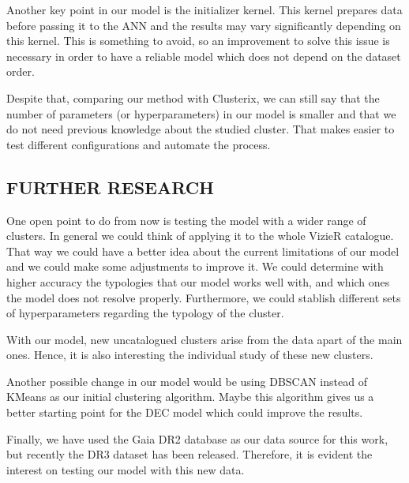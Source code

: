 \documentclass[11pt,a4paper,english,twocolumn]{article}
\begin{document}
Another key point in our model is the initializer kernel.
This kernel prepares data before passing it to the ANN
and the results may vary significantly depending on this kernel.
This is something to avoid, so an improvement to solve this issue is necessary
in order to have a reliable model which does not depend on the dataset order.

Despite that, comparing our method with Clusterix, we can still say that the
number of parameters (or hyperparameters) in our model is smaller and that
we do not need previous knowledge about the studied cluster.
That makes easier to test different configurations and automate the process.

\subsection{FURTHER RESEARCH}

One open point to do from now is testing the model with a wider range of clusters.
In general we could think of applying it to the whole VizieR catalogue.
That way we could have a better idea about the current limitations of our model
and we could make some adjustments to improve it. We could determine with higher
accuracy the typologies that our model works well with, and which ones the model
does not resolve properly. Furthermore, we could stablish different sets of
hyperparameters regarding the typology of the cluster.

With our model, new uncatalogued clusters arise from the data apart of the main ones.
Hence, it is also interesting the individual study of these new clusters.

Another possible change in our model would be using DBSCAN instead of KMeans
as our initial clustering algorithm. Maybe this algorithm gives us a better starting
point for the DEC model which could improve the results.

Finally, we have used the Gaia DR2 database as our data source for this work,
but recently the DR3 dataset has been released.
Therefore, it is evident the interest on testing our model with this new data.

\renewcommand{\refname}{REFERENCES}


\end{document}

